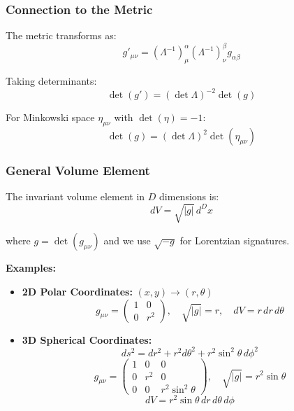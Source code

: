 \documentclass[11pt,a4paper]{article}
\begin{document}
\subsubsection{Connection to the Metric}

The metric transforms as:
\begin{equation}
g'_{\mu\nu} = (\Lambda^{-1})^\alpha_\mu (\Lambda^{-1})^\beta_\nu g_{\alpha\beta}
\end{equation}

Taking determinants:
\begin{equation}
\det(g') = (\det \Lambda)^{-2} \det(g)
\end{equation}

For Minkowski space $\eta_{\mu\nu}$ with $\det(\eta) = -1$:
\begin{equation}
\det(g) = (\det \Lambda)^2 \det(\eta_{\mu\nu})
\end{equation}

\subsubsection{General Volume Element}

The invariant volume element in $D$ dimensions is:
\begin{equation}
\boxed{dV = \sqrt{|g|} \, d^Dx}
\end{equation}

where $g = \det(g_{\mu\nu})$ and we use $\sqrt{-g}$ for Lorentzian signatures.

\textbf{Examples:}

\begin{itemize}
\item \textbf{2D Polar Coordinates:} $(x,y) \to (r,\theta)$
\begin{equation}
g_{\mu\nu} = \begin{pmatrix} 1 & 0 \\ 0 & r^2 \end{pmatrix}, \quad \sqrt{|g|} = r, \quad dV = r \, dr \, d\theta
\end{equation}

\item \textbf{3D Spherical Coordinates:}
\begin{equation}
ds^2 = dr^2 + r^2 d\theta^2 + r^2\sin^2\theta \, d\phi^2
\end{equation}
\begin{equation}
g_{\mu\nu} = \begin{pmatrix} 1 & 0 & 0 \\ 0 & r^2 & 0 \\ 0 & 0 & r^2\sin^2\theta \end{pmatrix}, \quad \sqrt{|g|} = r^2\sin\theta
\end{equation}
\begin{equation}
dV = r^2\sin\theta \, dr \, d\theta \, d\phi
\end{equation}
\end{itemize}
\end{document}
